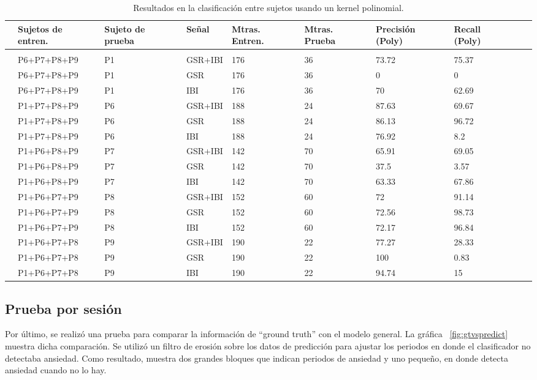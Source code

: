 \begin{table}[h!]
        \footnotesize
        \centering
        \caption{Resultados en la clasificaci\'on entre sujetos usando un kernel polinomial.}
\label{table:resultsCross}
        \begin{tabular}{m{.2cm}m{2.5cm}m{1.2cm}m{1.2cm}m{1.2cm}m{1.2cm}m{1.2cm}m{1.2cm}m{1.2cm}m{1.2cm}}
                \hline\noalign{\smallskip}
    &\textbf{Sujetos de entren.}&\textbf{Sujeto de prueba}&\textbf{Se\~nal} &\textbf{Mtras. Entren.}&\textbf{Mtras. Prueba}&\textbf{Precisi\'on (Poly)}& \textbf{Recall (Poly)}\\
	\hline                
 \\\noalign{\smallskip}
&P6+P7+P8+P9&P1&GSR+IBI&176&36&73.72&75.37\\
&P6+P7+P8+P9&P1&GSR&176&36&0&0\\
&P6+P7+P8+P9&P1&IBI&176&36&70&62.69\\
&P1+P7+P8+P9&P6&GSR+IBI&188&24&87.63&69.67\\
&P1+P7+P8+P9&P6&GSR&188&24&86.13&96.72\\
&P1+P7+P8+P9&P6&IBI&188&24&76.92&8.2\\
&P1+P6+P8+P9&P7&GSR+IBI&142&70&65.91&69.05\\
&P1+P6+P8+P9&P7&GSR&142&70&37.5&3.57\\
&P1+P6+P8+P9&P7&IBI&142&70&63.33&67.86\\
&P1+P6+P7+P9&P8&GSR+IBI&152&60&72&91.14\\
&P1+P6+P7+P9&P8&GSR&152&60&72.56&98.73\\
&P1+P6+P7+P9&P8&IBI&152&60&72.17&96.84\\
&P1+P6+P7+P8&P9&GSR+IBI&190&22&77.27&28.33\\
&P1+P6+P7+P8&P9&GSR&190&22&100&0.83\\
&P1+P6+P7+P8&P9&IBI&190&22&94.74&15\\
    \end{tabular}
\end{table}
\newpage
\subsection{Prueba por sesi\'on}
Por \'ultimo, se realiz\'o una prueba para comparar la informaci\'on de ``ground truth'' con el modelo general. La gr\'afica ~\ref{fig:gtvspredict} muestra dicha comparaci\'on. Se utiliz\'o un filtro de erosi\'on sobre los datos de predicci\'on para ajustar los periodos en donde el clasificador no detectaba ansiedad. Como resultado, muestra dos grandes bloques que indican periodos de ansiedad y uno peque\~no, en donde detecta ansiedad cuando no lo hay.

